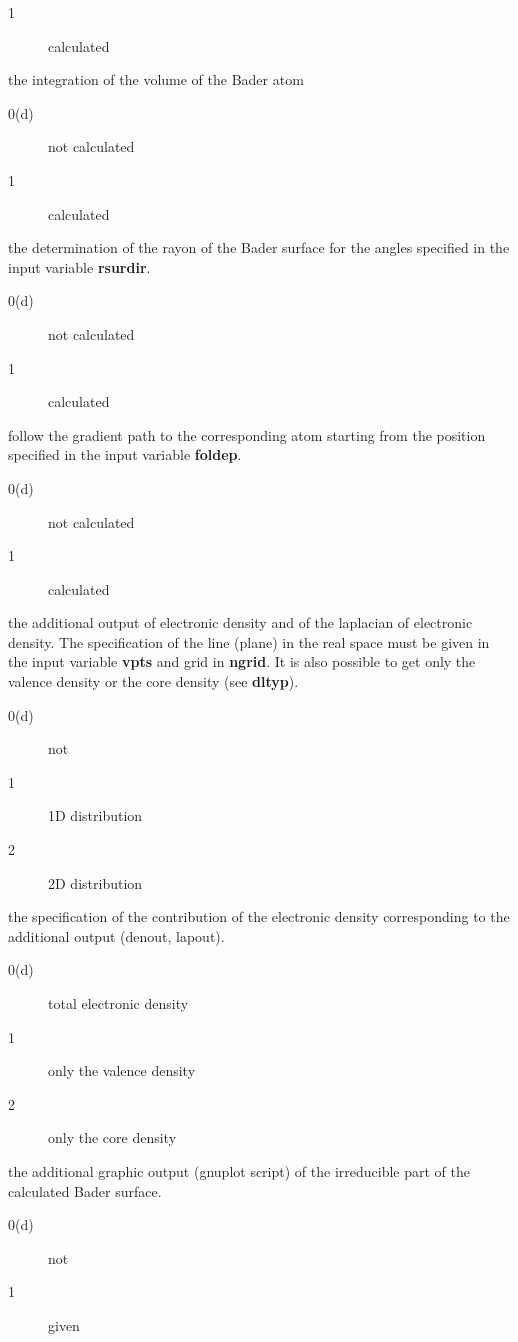 \documentclass[11pt]{article}
\begin{document}
\begin{description}
\begin{description}
    \item [1] calculated
  \end{description}
\item [ivol] the integration of the volume of the Bader atom
  \begin{description}
    \item [0(d)] not calculated
    \item [1] calculated
  \end{description}
\item [rsur] the determination of the rayon of the Bader surface for
the angles specified in the input variable {\bf rsurdir}.
  \begin{description}
    \item [0(d)] not calculated
    \item [1] calculated
  \end{description}
\item [follow] follow the gradient path to the corresponding atom
starting from the position specified in the input variable {\bf foldep}.
  \begin{description}
    \item [0(d)] not calculated
    \item [1] calculated
  \end{description}
\item [denout,lapout] the additional output of electronic density
and of the laplacian of electronic density. The specification of the
line (plane) in the real space must be given in the input variable
{\bf vpts} and grid in {\bf ngrid}. It is also possible to get only the
valence density or the core density (see {\bf dltyp}).
  \begin{description}
    \item [0(d)] not
    \item [1] 1D distribution
    \item [2] 2D distribution
  \end{description}
\item [dltyp] the specification of the contribution of the electronic
density corresponding to the additional output (denout, lapout).
  \begin{description}
    \item [0(d)] total electronic density
    \item [1] only the valence density
    \item [2] only the core density
  \end{description}
\item [gpsurf]  the additional graphic output (gnuplot script) of the
irreducible part of the calculated Bader surface.
  \begin{description}
    \item [0(d)] not
    \item [1] given
  \end{description}
\end{description}
\end{document}
